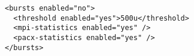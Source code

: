 \begin{verbatim}
<bursts enabled="no">
  <threshold enabled="yes">500u</threshold>
  <mpi-statistics enabled="yes" />
  <pacx-statistics enabled="yes" />
</bursts>
\end{verbatim}
